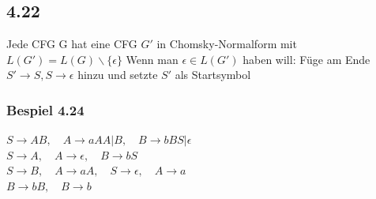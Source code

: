 \documentclass[11pt]{article}
\begin{document}
\subsection{4.22}
\label{sec:org04b7600}
Jede CFG G hat eine CFG \(G'\) in Chomsky-Normalform mit \(L(G') = L(G) \backslash \{\epsilon\}\)
Wenn man \(\epsilon \in L(G')\) haben will: Füge am Ende \(S' \rightarrow S, S\rightarrow \epsilon\) hinzu und setzte \(S'\) als Startsymbol

\subsubsection{Bespiel 4.24}
\label{sec:org1cb18a5}
\(S \rightarrow AB,\quad A \rightarrow aAA|B,\quad B \rightarrow bBS|\epsilon\) \\
\(S \rightarrow A,\quad A \rightarrow \epsilon,\quad B \rightarrow bS\) \\
\(S \rightarrow B,\quad A \rightarrow aA,\quad S \rightarrow \epsilon,\quad A \rightarrow a\) \\
\(B \rightarrow bB,\quad B \rightarrow b\)
\end{document}
